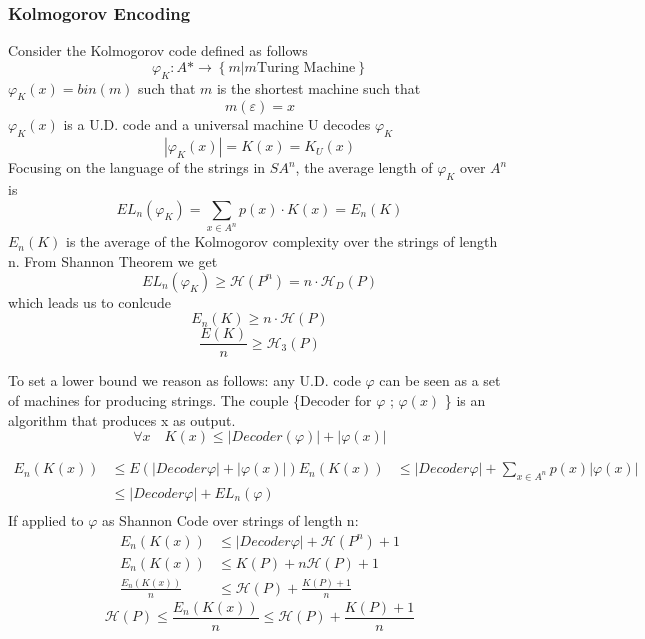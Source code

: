    \subsubsection{Kolmogorov Encoding}
    Consider the Kolmogorov code defined as follows
    \[ 
        \varphi_K: A* \longrightarrow \left\{ m | m \text{Turing Machine} \right\} 
    \]
    $ \varphi_K(x) = bin(m)$ such that $m$ is the shortest machine such that \[ 
         m(\varepsilon) = x
    \] 
    $\varphi_K(x)$ is a U.D. code and a universal machine U decodes $\varphi_K$
    \[ 
        |\varphi_K(x)| = K(x) = K_U(x) 
    \]
    Focusing on the language of the strings in $SA^n$, the average length of $\varphi_K$ over $A^n$ is
    \[ 
        EL_n(\varphi_K) = \sum_{x\in A^n}{p(x)\cdot K(x)} = E_n(K)
    \]
    $E_n(K)$ is the average of the Kolmogorov complexity over the strings of length n.
    From Shannon Theorem we get
    \[ 
        EL_n(\varphi_K) \geq \mathcal{H}(P^n) = n\cdot \mathcal{H}_D(P) 
    \]which leads us to conlcude
    \[ 
        E_n(K)\geq n\cdot \mathcal{H}(P) 
    \]
    \[ 
        \frac{E(K) }{n} \geq \mathcal{H}_3(P)
    \]

    To set a lower bound we reason as follows: any U.D. code $\varphi$ can be seen as a set of machines for producing strings. The couple \{Decoder for $\varphi$ ; $\varphi(x)$ \} is an algorithm that produces x as output.
    \[ 
        \forall x\quad K(x) \leq |Decoder(\varphi)|+|\varphi(x)| 
    \]

    \begin{align*}
        E_n(K(x)) &\leq E(|Decoder \varphi| +|\varphi(x)|)
        E_n(K(x)) &\leq |Decoder \varphi|+ \sum_{x\in A^n}{p(x)|\varphi(x)|}\\
        & \leq |Decoder \varphi| + EL_n(\varphi)\\
    \end{align*}
    If applied to $\varphi$ as Shannon Code over strings of length n:
    \begin{align*}
        E_n(K(x)) &\leq |Decoder \varphi| + \mathcal{H}(P^n)+1\\
        E_n(K(x)) &\leq K(P) + n\mathcal{H}(P)+1\\
        \frac{E_n(K(x))}{n} &\leq \mathcal{H}(P) + \frac{K(P)+1}{n}
    \end{align*}
    \[ 
        \mathcal{H}(P)\leq \frac{E_n(K(x))}{n} \leq \mathcal{H}(P) + \frac{K(P)+1}{n} 
    \]
    

